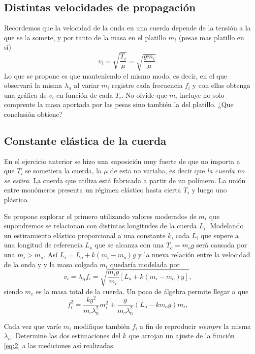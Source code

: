 \documentclass[laboratorio]{guia}
\begin{document}
\subsection{Distintas velocidades de propagación}
Recordemos que la velocidad de la onda en una cuerda depende de la tensión a la que se la somete, y por tanto de la masa en el platillo \(m_i\) (pesas mas platillo en sí)
\begin{equation}
  v_i= \sqrt{\frac{T_i}{\mu}}= \sqrt{\frac{g m_i}{\mu}}.
\end{equation}
Lo que se propone es que manteniendo el mismo modo, es decir, en el que observará la misma \(\lambda_n\) al variar \(m_i\) registre cada frecuencia \(f_i\) y con ellas obtenga una gráfica de \(v_i\) en función de cada \(T_i\).
No olvide que \(m_i\) incluye no solo comprente la masa aportada por las pesas sino también la del platillo.
¿Que conclusión obtiene?


\subsection{Constante elástica de la cuerda}
En el ejercicio anterior se hizo una suposición muy fuerte de que no importa a que \(T_i\) se sometiera la cuerda, la \(\mu\) de esta no variaba, es decir que \emph{la cuerda no se estira}.
La cuerda que utiliza está fabricada a partir de un polímero.
La unión entre monómeros presenta un régimen elástico hasta cierta \(T_i\) y luego uno plástico.

Se propone explorar el primero utilizando valores moderados de \(m_i\) que supondremos se relacionan con distintas longitudes de la cuerda \(L_i\).
Modelando un estiramiento elástico proporcional a una constante \(k\), cada \(L_i\) que supere a una longitud de referencia \(L_o\) que se alcanza con una \(T_o= m_o g\) será causada por una \(m_i > m_o\).
Así \(L_i= L_o+ k (m_i - m_o) g\) y la nueva relación entre la velocidad de la onda y y la masa colgada \(m_i\) quedaría modelada por
\begin{equation}
  v_i = \lambda_n f_i= \sqrt{\frac{m_i g}{m_c}\left[L_o + k (m_i - m_o) g \right] },
  \label{eq:1}
\end{equation}
siendo \(m_c\) es la masa total de la cuerda.
Un poco de álgebra permite llegar a que
\begin{equation}
  f_i^2 = \frac{k g^2}{m_c \lambda_n^2} m_i^2+ \frac{g}{m_c \lambda_n^2} \left(L_o- k m_o g \right) m_i,
  \label{eq:2}
\end{equation}

Cada vez que varíe \(m_i\) modifique también \(f_i\) a fin de reproducir \emph{siempre} la misma \(\lambda_n\).
Determine las dos estimaciones del \(k\) que arrojan un ajuste de la función \ref{eq:2} a las mediciones así realizadas.



\nocite{Alonso1998,Crawford1994}
 

\end{document}
